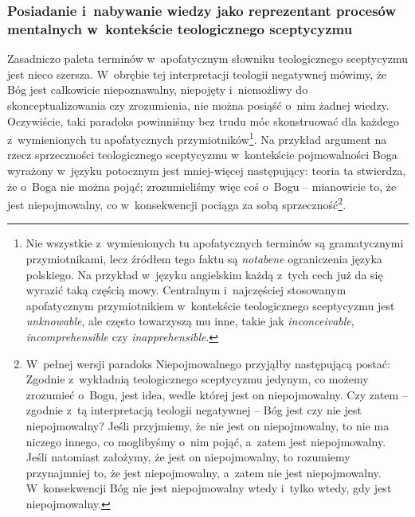 \subsubsection{Posiadanie i~nabywanie wiedzy jako reprezentant procesów mentalnych w~kontekście teologicznego sceptycyzmu}

Zasadniczo paleta terminów w~apofatycznym słowniku teologicznego sceptycyzmu jest nieco szersza. W~obrębie tej interpretacji teologii negatywnej mówimy, że Bóg jest całkowicie niepoznawalny, niepojęty i~niemożliwy do skonceptualizowania czy zrozumienia, nie można posiąść o~nim żadnej wiedzy. Oczywiście, taki paradoks powinniśmy bez trudu móc skonstruować dla każdego z~wymienionych tu apofatycznych przymiotników\footnote{Nie wszystkie z~wymienionych tu apofatycznych terminów są gramatycznymi przymiotnikami, lecz źródłem tego faktu są \textit{notabene} ograniczenia języka polskiego. Na przykład w~języku angielskim każdą z~tych cech już da się wyrazić taką częścią mowy. Centralnym i~najczęściej stosowanym apofatycznym przymiotnikiem w~kontekście teologicznego sceptycyzmu jest \textit{unknowable}, ale często towarzyszą mu inne, takie jak \textit{inconceivable}, \textit{incomprehensible} czy \textit{inapprehensible}.}. Na przykład argument na rzecz sprzeczności teologicznego sceptycyzmu w~kontekście pojmowalności Boga wyrażony w~języku potocznym jest mniej-więcej następujący: teoria ta stwierdza, że o~Boga nie można pojąć; zrozumieliśmy więc coś o~Bogu -- mianowicie to, że jest niepojmowalny, co w~konsekwencji pociąga za sobą sprzeczność\footnote{W~pełnej wersji paradoks Niepojmowalnego przyjąłby następującą postać: Zgodnie z~wykładnią teologicznego sceptycyzmu jedynym, co możemy zrozumieć o~Bogu, jest idea, wedle której jest on niepojmowalny. Czy zatem -- zgodnie z~tą interpretacją teologii negatywnej -- Bóg jest czy nie jest niepojmowalny? Jeśli przyjmiemy, że nie jest on niepojmowalny, to nie ma niczego innego, co moglibyśmy o~nim pojąć, a~zatem jest niepojmowalny. Jeśli natomiast założymy, że jest on niepojmowalny, to rozumiemy przynajmniej to, że jest niepojmowalny, a~zatem nie jest niepojmowalny. W~konsekwencji Bóg nie jest niepojmowalny wtedy i~tylko wtedy, gdy jest niepojmowalny.}.

